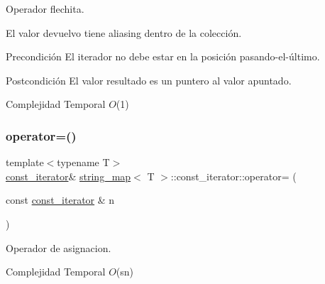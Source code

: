 Operador flechita. 

El valor devuelvo tiene aliasing dentro de la colección.

\begin{DoxyPrecond}{Precondición}
El iterador no debe estar en la posición pasando-\/el-\/último. 
\end{DoxyPrecond}
\begin{DoxyPostcond}{Postcondición}
El valor resultado es un puntero al valor apuntado.
\end{DoxyPostcond}

\begin{DoxyDescription}
\item[Complejidad Temporal]$O$(1)
\end{DoxyDescription}\mbox{\label{classstring__map_1_1const__iterator_af77133bc617118fa4fd8b28cebb6c01e}} 
\subsubsection{\texorpdfstring{operator=()}{operator=()}}
{\footnotesize\ttfamily template$<$typename T$>$ \\
\mbox{\hyperlink{classstring__map_1_1const__iterator}{const\+\_\+iterator}}\& \mbox{\hyperlink{classstring__map}{string\+\_\+map}}$<$ T $>$\+::const\+\_\+iterator\+::operator= (\begin{DoxyParamCaption}\item[{const \mbox{\hyperlink{classstring__map_1_1const__iterator}{const\+\_\+iterator}} \&}]{n }\end{DoxyParamCaption})\hspace{0.3cm}{\ttfamily [inline]}}



Operador de asignacion. 


\begin{DoxyDescription}
\item[Complejidad Temporal]$O$(sn)
\end{DoxyDescription}\mbox{\label{classstring__map_1_1const__iterator_ac383d9e25f6acb73964f39293a9d93a7}} 
